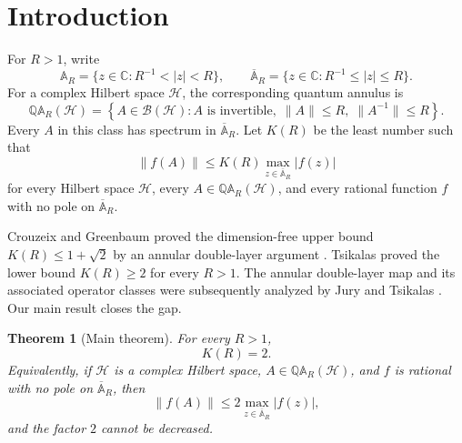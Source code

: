 \documentclass[preprints,article,submit,oneauthor]{Definitions/mdpi}
\newcounter{manuscriptresult}[section]
\theoremstyle{mdpi}
\newtheorem{theorem}[manuscriptresult]{Theorem}
\theoremstyle{definition}
\newcommand{\C}{\mathbb C}
\begin{document}
\section{Introduction}
\label{sec:introduction}

For $R>1$, write
\begin{equation}
  \mathbb A_R=\{z\in\C:R^{-1}<\lvert z\rvert<R\},
  \qquad
  \overline{\mathbb A}_R
  =\{z\in\C:R^{-1}\leq\lvert z\rvert\leq R\}.
  \label{eq:annulus}
\end{equation}
For a complex Hilbert space $\mathcal H$, the corresponding quantum
annulus is
\begin{equation}
  \mathbb Q\mathbb A_R(\mathcal H)
  =\left\{A\in\mathcal B(\mathcal H):
  A\text{ is invertible},\;
  \lVert A\rVert\leq R,\;
  \lVert A^{-1}\rVert\leq R\right\}.
  \label{eq:quantum-annulus}
\end{equation}
Every $A$ in this class has spectrum in
$\overline{\mathbb A}_R$.  Let $K(R)$ be the least number such that
\begin{equation}
  \lVert f(A)\rVert
  \leq K(R)\max_{z\in\overline{\mathbb A}_R}\lvert f(z)\rvert
  \label{eq:spectral-constant}
\end{equation}
for every Hilbert space $\mathcal H$, every
$A\in\mathbb Q\mathbb A_R(\mathcal H)$, and every rational function
$f$ with no pole on $\overline{\mathbb A}_R$.

Crouzeix and Greenbaum proved the dimension-free upper bound
$K(R)\leq1+\sqrt2$ by an annular double-layer argument
\cite[Section~5]{CrouzeixGreenbaum2019}.  Tsikalas proved the lower
bound $K(R)\geq2$ for every $R>1$\cite[Theorem~1.1]{Tsikalas2022}.
The annular double-layer map and its associated operator classes were
subsequently analyzed by Jury and Tsikalas
\cite{JuryTsikalas2024}.  Our main result closes the gap.

\begin{theorem}[Main theorem]
\label{thm:main}
For every $R>1$,
\begin{equation}
  K(R)=2.
  \label{eq:constant-two}
\end{equation}
Equivalently, if $\mathcal H$ is a complex Hilbert space,
$A\in\mathbb Q\mathbb A_R(\mathcal H)$, and $f$ is rational with no
pole on $\overline{\mathbb A}_R$, then
\begin{equation}
  \lVert f(A)\rVert
  \leq2\max_{z\in\overline{\mathbb A}_R}\lvert f(z)\rvert,
  \label{eq:main-estimate}
\end{equation}
and the factor $2$ cannot be decreased.
\end{theorem}
\end{document}
